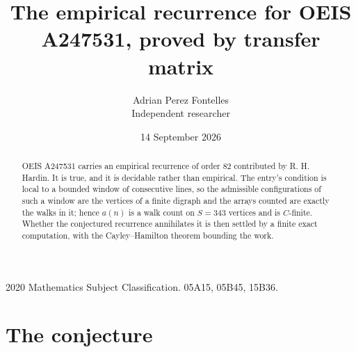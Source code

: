 \documentclass[11pt,a4paper]{article}
\title{The empirical recurrence for OEIS A247531, proved by transfer matrix}
\author{Adrian Perez Fontelles\\ \small Independent researcher}
\date{14 September 2026}
\theoremstyle{plain}
\theoremstyle{definition}
\begin{document}
\maketitle

\begin{abstract}
OEIS A247531 carries an empirical recurrence of order $82$ contributed by R. H. Hardin. It is
true, and it is decidable rather than empirical. The entry's condition is local to a bounded window of consecutive lines, so
the admissible configurations of such a window are the vertices of a finite digraph and the
arrays counted are exactly the walks in it; hence $a(n)$ is a walk count on $S=343$ vertices
and is $C$-finite. Whether the conjectured recurrence annihilates it is then settled by a
finite exact computation, with the Cayley--Hamilton theorem bounding the work.
\end{abstract}

\noindent\small 2020 Mathematics Subject Classification. 05A15, 05B45, 15B36.\normalsize

\section{The conjecture}
\end{document}
